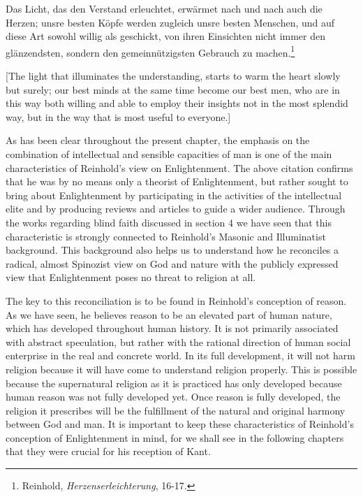 Das Licht, das den Verstand erleuchtet, erw\"{a}rmet nach und nach auch die Herzen; unsre besten K\"{o}pfe werden zugleich unsre besten Menschen, und auf diese Art sowohl willig als geschickt, von ihren Einsichten nicht immer den gl\"{a}nzendsten, sondern den gemeinn\"{u}tzigsten Gebrauch zu machen.\footnote{ Reinhold, \textit{Herzenserleichterung}, 16{-}17. } 

[The light that illuminates the understanding, starts to warm the heart slowly but surely; our best minds at the same time become our best men, who are in this way both willing and able to employ their insights not in the most splendid way, but in the way that is most useful to everyone.]

As has been clear throughout the present chapter, the emphasis on the combination of intellectual and sensible capacities of man is one of the main characteristics of Reinhold's view on Enlightenment. The above citation confirms that he was by no means only a theorist of Enlightenment, but rather sought to bring about Enlightenment by participating in the activities of the intellectual elite and by producing reviews and articles to guide a wider audience. Through the works regarding blind faith discussed in section 4 we have seen that this characteristic is strongly connected to Reinhold's Masonic and Illuminatist background. This background also helps us to understand how he reconciles a radical, almost Spinozist view on God and nature with the publicly expressed view that Enlightenment poses no threat to religion at all. 

 The key to this reconciliation is to be found in Reinhold's conception of reason. As we have seen, he believes reason to be an elevated part of human nature, which has developed throughout human history. It is not primarily associated with abstract speculation, but rather with the rational direction of human social enterprise in the real and concrete world. In its full development, it will not harm religion because it will have come to understand religion properly. This is possible because the supernatural religion as it is practiced has only developed because human reason was not fully developed yet. Once reason is fully developed, the religion it prescribes will be the fulfillment of the natural and original harmony between God and man. It is important to keep these characteristics of Reinhold's conception of Enlightenment in mind, for we shall see in the following chapters that they were crucial for his reception of Kant. 

